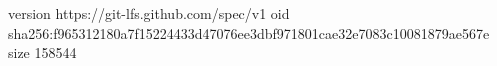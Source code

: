 version https://git-lfs.github.com/spec/v1
oid sha256:f965312180a7f15224433d47076ee3dbf971801cae32e7083c10081879ae567e
size 158544
